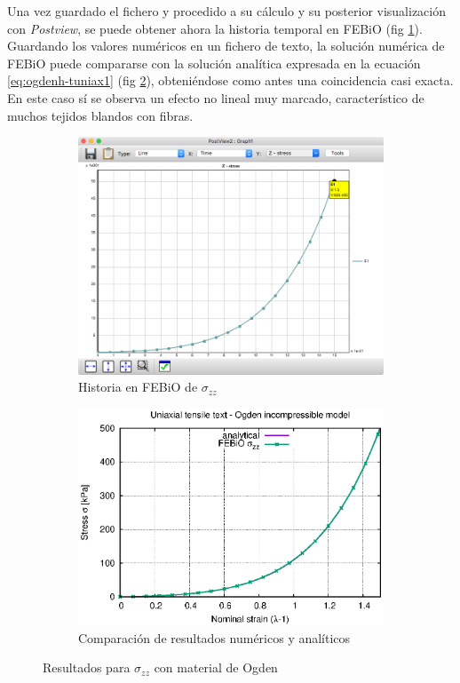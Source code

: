 Una vez guardado el fichero y procedido a su cálculo y su posterior visualización con \emph{Postview}, se puede obtener ahora la historia temporal en FEBiO (fig \ref{fig:01-thist-ogden-szz}).
Guardando los valores numéricos en un fichero de texto, la solución numérica de FEBiO puede compararse con la solución analítica expresada en la ecuación \eqref{eq:ogdenh-tuniax1} (fig \ref{fig:hogden_feb}), obteniéndose como antes una coincidencia casi exacta.
En este caso sí se observa un efecto no lineal muy marcado, característico de muchos tejidos blandos con fibras.

\begin{figure}[!htp]
\centering
\begin{subfigure}[b]{0.43\textwidth}
\centering
\includegraphics[width=\textwidth]{figuras_3/01-thist-ogden-szz.png}
\caption{Historia en FEBiO de $\sigma_{zz}$}
\label{fig:01-thist-ogden-szz}
\end{subfigure}
\begin{subfigure}[b]{0.53\textwidth}
\centering
\includegraphics[width=\textwidth]{figuras_3/hogden_feb.eps}
\caption{Comparación de resultados numéricos y analíticos}
\label{fig:hogden_feb}
\end{subfigure}
\caption{Resultados para $\sigma_{zz}$ con material de Ogden}
\label{fig:th-hogden}
\end{figure}

